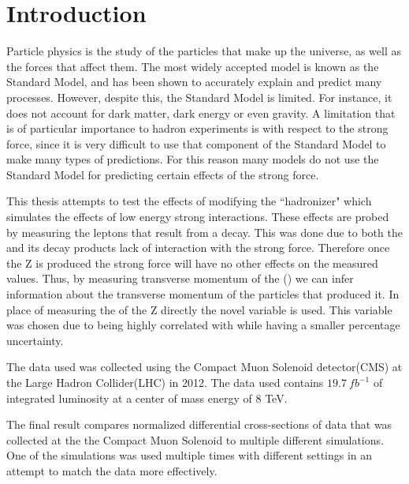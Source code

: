 \chapter{Introduction}
\label{intro_chapter}
Particle physics is the study of the particles that make up the universe, as well as the forces that affect them. The most widely accepted model is known as the Standard Model, and has been shown to accurately explain and predict many processes. However, despite this, the Standard Model is limited. For instance, it does not account for dark matter, dark energy or even gravity. A limitation that is of particular importance to hadron experiments is with respect to the strong force, since it is very difficult to use that component of the Standard Model to make many types of predictions. For this reason many models do not use the Standard Model for predicting certain effects of the strong force. 

This thesis attempts to test the effects of modifying the ``hadronizer" which simulates the effects of low energy strong interactions. These effects are probed by measuring the leptons that result from a \Z decay. This was done due to both the \Z and its decay products lack of interaction with the strong force.  Therefore once the Z is produced the strong force will have no other effects on the measured values. Thus, by measuring transverse momentum of the \Z(\bosonpt) we can infer information about the transverse momentum of the particles that produced it. In place of measuring the \bosonpt of the Z directly the novel variable \phistar is used. This variable was chosen due to being highly correlated with \bosonpt  while having a smaller percentage uncertainty.  

The data used was collected using the Compact Muon Solenoid detector(CMS) at the Large Hadron Collider(LHC) in 2012. The data used  contains $\SI{19.7}{fb}^{-1}$ of integrated luminosity at a center of mass energy of 8 TeV. 

The final result compares normalized \phistar differential cross-sections of data that was collected at the the Compact Muon Solenoid to multiple different simulations. One of the simulations was used multiple times with different settings in an attempt to match the data more effectively.





